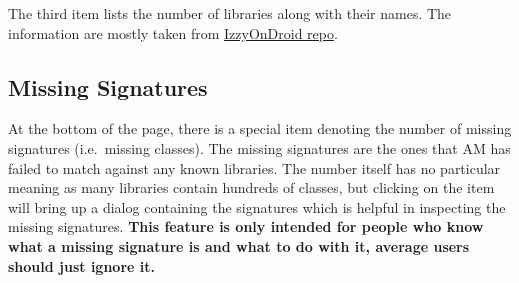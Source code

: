 The third item lists the number of libraries along with their names. The information are mostly taken from
\href{https://gitlab.com/IzzyOnDroid/repo}{IzzyOnDroid repo}.


\subsection{Missing Signatures}\label{subsec:missing-signatures} %
At the bottom of the page, there is a special item denoting the number of missing signatures (i.e.\ missing classes).
The missing signatures are the ones that AM has failed to match against any known libraries. The number itself has no
particular meaning as many libraries contain hundreds of classes, but clicking on the item will bring up a dialog
containing the signatures which is helpful in inspecting the missing signatures. \textbf{This feature is only intended
for people who know what a missing signature is and what to do with it, average users should just ignore it.}
